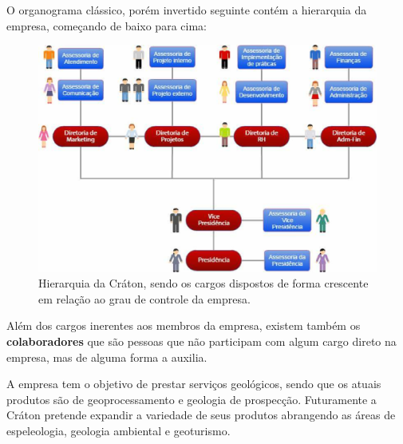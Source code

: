   O organograma clássico, porém invertido seguinte contém a hierarquia da empresa, começando
  de baixo para cima:

  \begin{figure}[!ht]
    \centering
    \includegraphics[width=15cm, keepaspectratio=true]{figuras/empresa/hierarquia-craton.eps}
    \caption{Hierarquia da Cráton, sendo os cargos dispostos de forma crescente em relação ao grau
              de controle da empresa.}
  \end{figure}

  Além dos cargos inerentes aos membros da empresa, existem também os \textbf{colaboradores}
  que são pessoas que não participam com algum cargo direto na empresa, mas de alguma forma
  a auxilia.

  A empresa tem o objetivo de prestar serviços geológicos, sendo que os atuais produtos são
  de geoprocessamento e geologia de prospecção. Futuramente a Cráton pretende expandir a
  variedade de seus produtos abrangendo as áreas de espeleologia, geologia ambiental e
  geoturismo.
